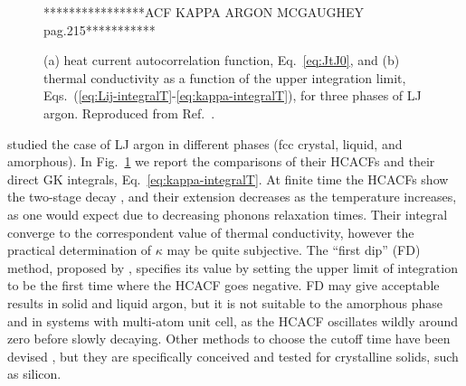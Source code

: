 \begin{LEtext}
\begin{figure}
    \begin{center}
    ****************ACF KAPPA ARGON MCGAUGHEY pag.215***********
    \end{center}
	\caption{(a) heat current autocorrelation function, Eq.~\eqref{eq:JtJ0}, and
    (b) thermal conductivity as a function of the upper integration limit, Eqs.~(\ref{eq:Lij-integralT}-\ref{eq:kappa-integralT}), for three phases of LJ argon. Reproduced from Ref.~\cite{McGaughey2004a}.} \label{fig:argon-gk-phases-examples}
\end{figure}
\citeauthor{McGaughey2006} \cite{McGaughey2006,McGaughey2004a,McGaughey2004b} studied the case of LJ argon in different phases (fcc crystal, liquid, and amorphous). In Fig.~\ref{fig:argon-gk-phases-examples} we report the comparisons of their HCACFs and their direct GK integrals, Eq.~\eqref{eq:kappa-integralT}. At finite time the HCACFs show the two-stage decay \cite{Ladd1986}, and their extension decreases as the temperature increases, as one would expect due to decreasing phonons relaxation times. Their integral converge to the correspondent value of thermal conductivity, however the practical determination of $\kappa$ may be quite subjective. The ``first dip'' (FD) method, proposed by \citet{Li1998}, specifies its value by setting the upper limit of integration to be the first time where the HCACF goes negative. FD may give acceptable results in solid and liquid argon, but it is not suitable to the amorphous phase and in systems with multi-atom unit cell, as the HCACF oscillates wildly around zero before slowly decaying. Other methods to choose the cutoff time have been devised \cite{Chen2010}, but they are specifically conceived and tested for crystalline solids, such as silicon.



\end{LEtext}
